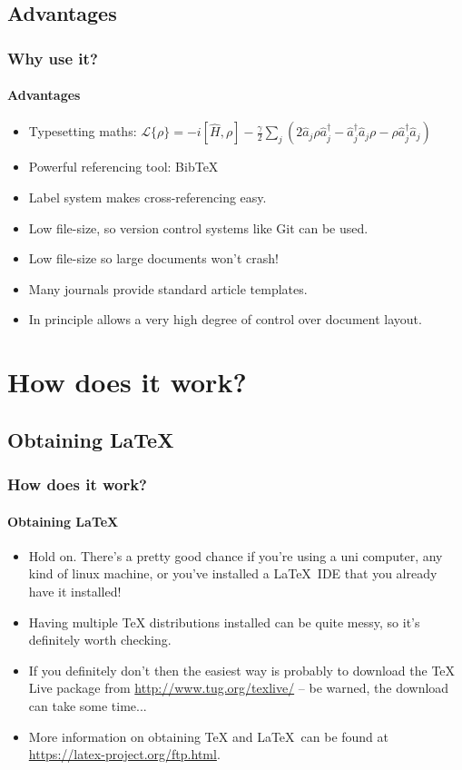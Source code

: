 \documentclass{beamer}
\begin{document}
\subsection[Pros]{Advantages}
\begin{frame}
\frametitle{Why use it?}
\framesubtitle{Advantages}

\begin{itemize}
\item Typesetting maths: \(\mathcal{L}\{\rho\} = -i[\hat{H}, \rho] - \frac{\gamma}{2}\sum_{j}\left(2 \hat{a}_{j}\rho\hat{a}_{j}^{\dagger} - \hat{a}_{j}^{\dagger}\hat{a}_{j}\rho - \rho\hat{a}_{j}^{\dagger}\hat{a}_{j}\right)\)
\item Powerful referencing tool: BibTeX
\item Label system makes cross-referencing easy.
\item Low file-size, so version control systems like Git can be used.
\item Low file-size so large documents won't crash!
\item Many journals provide standard article templates.
\item In principle allows a very high degree of control over document layout.
\end{itemize}
\end{frame}

\section{How does it work?}

\subsection{Obtaining \LaTeX}
\begin{frame}
\frametitle{How does it work?}
\framesubtitle{Obtaining \LaTeX}
\begin{itemize}
\item \alert{Hold on.} There's a pretty good chance if you're using a uni computer, any kind of linux machine, or you've installed a \LaTeX\ IDE that you already have it installed!
\item Having multiple TeX distributions installed can be quite messy, so it's definitely worth checking.
\item If you definitely don't then the easiest way is probably to download the TeX Live package from \url{http://www.tug.org/texlive/} -- be warned, the download can take some time...
\item More information on obtaining TeX and \LaTeX\ can be found at \url{https://latex-project.org/ftp.html}.
\end{itemize}
\end{frame}
\end{document}

